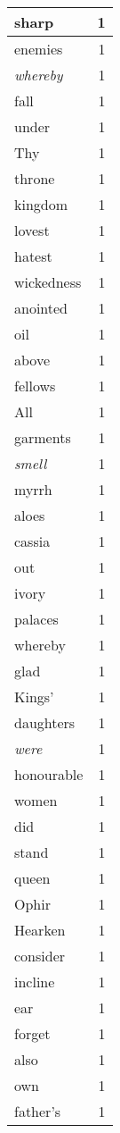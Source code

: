 \begin{center}
\begin{longtable}{l|r}
sharp & 1\\ \hline 
enemies & 1\\ \hline 
\emph{whereby} & 1\\ \hline 
fall & 1\\ \hline 
under & 1\\ \hline 
Thy & 1\\ \hline 
throne & 1\\ \hline 
kingdom & 1\\ \hline 
lovest & 1\\ \hline 
hatest & 1\\ \hline 
wickedness & 1\\ \hline 
anointed & 1\\ \hline 
oil & 1\\ \hline 
above & 1\\ \hline 
fellows & 1\\ \hline 
All & 1\\ \hline 
garments & 1\\ \hline 
\emph{smell} & 1\\ \hline 
myrrh & 1\\ \hline 
aloes & 1\\ \hline 
cassia & 1\\ \hline 
out & 1\\ \hline 
ivory & 1\\ \hline 
palaces & 1\\ \hline 
whereby & 1\\ \hline 
glad & 1\\ \hline 
Kings' & 1\\ \hline 
daughters & 1\\ \hline 
\emph{were} & 1\\ \hline 
honourable & 1\\ \hline 
women & 1\\ \hline 
did & 1\\ \hline 
stand & 1\\ \hline 
queen & 1\\ \hline 
Ophir & 1\\ \hline 
Hearken & 1\\ \hline 
consider & 1\\ \hline 
incline & 1\\ \hline 
ear & 1\\ \hline 
forget & 1\\ \hline 
also & 1\\ \hline 
own & 1\\ \hline 
father's & 1\\ \hline 

\end{longtable}
\end{center}
